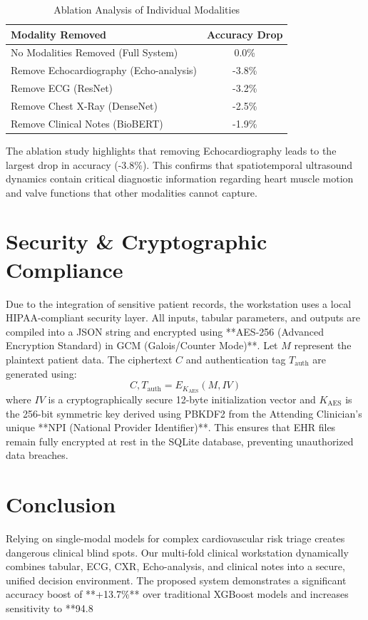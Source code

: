 \documentclass[11pt,onecolumn]{article}
\begin{document}
\begin{table}[htbp]
\centering
\caption{Ablation Analysis of Individual Modalities}
\label{tab:ablation}
\vspace{0.1in}
\begin{tabular}{lc}
\toprule
\textbf{Modality Removed} & \textbf{Accuracy Drop} \\
\midrule
No Modalities Removed (Full System) & 0.0\% \\
Remove Echocardiography (Echo-analysis) & -3.8\% \\
Remove ECG (ResNet) & -3.2\% \\
Remove Chest X-Ray (DenseNet) & -2.5\% \\
Remove Clinical Notes (BioBERT) & -1.9\% \\
\bottomrule
\end{tabular}
\end{table}

The ablation study highlights that removing Echocardiography leads to the largest drop in accuracy (-3.8\%). This confirms that spatiotemporal ultrasound dynamics contain critical diagnostic information regarding heart muscle motion and valve functions that other modalities cannot capture.

\section{Security \& Cryptographic Compliance}
Due to the integration of sensitive patient records, the workstation uses a local HIPAA-compliant security layer.
All inputs, tabular parameters, and outputs are compiled into a JSON string and encrypted using **AES-256 (Advanced Encryption Standard) in GCM (Galois/Counter Mode)**.
Let $M$ represent the plaintext patient data. The ciphertext $C$ and authentication tag $T_{\text{auth}}$ are generated using:
\begin{equation}
C, T_{\text{auth}} = E_{K_{\text{AES}}}(M, IV)
\end{equation}
where $IV$ is a cryptographically secure 12-byte initialization vector and $K_{\text{AES}}$ is the 256-bit symmetric key derived using PBKDF2 from the Attending Clinician's unique **NPI (National Provider Identifier)**. This ensures that EHR files remain fully encrypted at rest in the SQLite database, preventing unauthorized data breaches.

\section{Conclusion}
Relying on single-modal models for complex cardiovascular risk triage creates dangerous clinical blind spots. Our multi-fold clinical workstation dynamically combines tabular, ECG, CXR, Echo-analysis, and clinical notes into a secure, unified decision environment. The proposed system demonstrates a significant accuracy boost of **+13.7\%** over traditional XGBoost models and increases sensitivity to **94.8%
\end{document}
